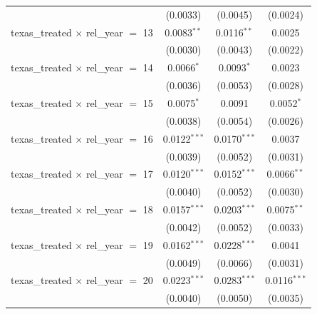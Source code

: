 \begin{tabular}{lccc}
                                                & (0.0033)              & (0.0045)               & (0.0024)\\   
   texas\_treated $\times$ rel\_year $=$ 13     & 0.0083$^{**}$         & 0.0116$^{**}$          & 0.0025\\   
                                                & (0.0030)              & (0.0043)               & (0.0022)\\   
   texas\_treated $\times$ rel\_year $=$ 14     & 0.0066$^{*}$          & 0.0093$^{*}$           & 0.0023\\   
                                                & (0.0036)              & (0.0053)               & (0.0028)\\   
   texas\_treated $\times$ rel\_year $=$ 15     & 0.0075$^{*}$          & 0.0091                 & 0.0052$^{*}$\\   
                                                & (0.0038)              & (0.0054)               & (0.0026)\\   
   texas\_treated $\times$ rel\_year $=$ 16     & 0.0122$^{***}$        & 0.0170$^{***}$         & 0.0037\\   
                                                & (0.0039)              & (0.0052)               & (0.0031)\\   
   texas\_treated $\times$ rel\_year $=$ 17     & 0.0120$^{***}$        & 0.0152$^{***}$         & 0.0066$^{**}$\\   
                                                & (0.0040)              & (0.0052)               & (0.0030)\\   
   texas\_treated $\times$ rel\_year $=$ 18     & 0.0157$^{***}$        & 0.0203$^{***}$         & 0.0075$^{**}$\\   
                                                & (0.0042)              & (0.0052)               & (0.0033)\\   
   texas\_treated $\times$ rel\_year $=$ 19     & 0.0162$^{***}$        & 0.0228$^{***}$         & 0.0041\\   
                                                & (0.0049)              & (0.0066)               & (0.0031)\\   
   texas\_treated $\times$ rel\_year $=$ 20     & 0.0223$^{***}$        & 0.0283$^{***}$         & 0.0116$^{***}$\\   
                                                & (0.0040)              & (0.0050)               & (0.0035)\\   

\end{tabular}
